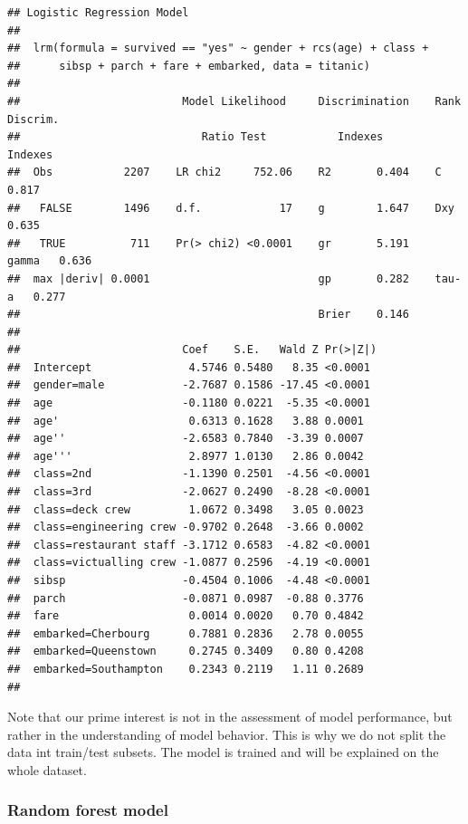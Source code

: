 \documentclass[12pt,]{krantz}
\begin{document}
\begin{verbatim}
## Logistic Regression Model
##  
##  lrm(formula = survived == "yes" ~ gender + rcs(age) + class + 
##      sibsp + parch + fare + embarked, data = titanic)
##  
##                         Model Likelihood     Discrimination    Rank Discrim.    
##                            Ratio Test           Indexes           Indexes       
##  Obs           2207    LR chi2     752.06    R2       0.404    C       0.817    
##   FALSE        1496    d.f.            17    g        1.647    Dxy     0.635    
##   TRUE          711    Pr(> chi2) <0.0001    gr       5.191    gamma   0.636    
##  max |deriv| 0.0001                          gp       0.282    tau-a   0.277    
##                                              Brier    0.146                     
##  
##                         Coef    S.E.   Wald Z Pr(>|Z|)
##  Intercept               4.5746 0.5480   8.35 <0.0001 
##  gender=male            -2.7687 0.1586 -17.45 <0.0001 
##  age                    -0.1180 0.0221  -5.35 <0.0001 
##  age'                    0.6313 0.1628   3.88 0.0001  
##  age''                  -2.6583 0.7840  -3.39 0.0007  
##  age'''                  2.8977 1.0130   2.86 0.0042  
##  class=2nd              -1.1390 0.2501  -4.56 <0.0001 
##  class=3rd              -2.0627 0.2490  -8.28 <0.0001 
##  class=deck crew         1.0672 0.3498   3.05 0.0023  
##  class=engineering crew -0.9702 0.2648  -3.66 0.0002  
##  class=restaurant staff -3.1712 0.6583  -4.82 <0.0001 
##  class=victualling crew -1.0877 0.2596  -4.19 <0.0001 
##  sibsp                  -0.4504 0.1006  -4.48 <0.0001 
##  parch                  -0.0871 0.0987  -0.88 0.3776  
##  fare                    0.0014 0.0020   0.70 0.4842  
##  embarked=Cherbourg      0.7881 0.2836   2.78 0.0055  
##  embarked=Queenstown     0.2745 0.3409   0.80 0.4208  
##  embarked=Southampton    0.2343 0.2119   1.11 0.2689  
## 
\end{verbatim}

Note that our prime interest is not in the assessment of model performance, but rather in the understanding of model behavior. This is why we do not split the data int train/test subsets. The model is trained and will be explained on the whole dataset.

\hypertarget{model-titanic-rf}{%
\subsubsection{Random forest model}\label{model-titanic-rf}}
\end{document}
